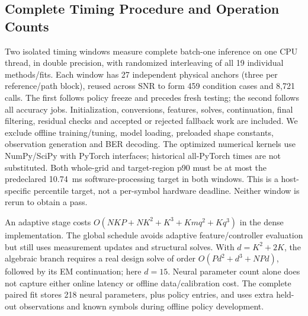 \subsection{Complete Timing Procedure and Operation Counts}
Two isolated timing windows measure complete batch-one inference on one CPU thread, in double precision, with randomized interleaving of all 19 individual methods/fits. Each window has 27 independent physical anchors (three per reference/path block), reused across SNR to form 459 condition cases and 8,721 calls. The first follows policy freeze and precedes fresh testing; the second follows all accuracy jobs. Initialization, conversions, features, solves, continuation, final filtering, residual checks and accepted or rejected fallback work are included. We exclude offline training/tuning, model loading, preloaded shape constants, observation generation and BER decoding. The optimized numerical kernels use NumPy/SciPy with PyTorch interfaces; historical all-PyTorch times are not substituted. Both whole-grid and target-region p90 must be at most the predeclared 10.74~ms software-processing target in both windows. This is a host-specific percentile target, not a per-symbol hardware deadline. Neither window is rerun to obtain a pass.

An adaptive stage costs $O(NKP+NK^2+K^3+Kmq^2+Kq^3)$ in the dense implementation. The global schedule avoids adaptive feature/controller evaluation but still uses measurement updates and structural solves. With $d=K^2+2K$, the algebraic branch requires a real design solve of order $O(Pd^2+d^3+NPd)$, followed by its EM continuation; here $d=15$. Neural parameter count alone does not capture either online latency or offline data/calibration cost. The complete paired fit stores 218 neural parameters, plus policy entries, and uses extra held-out observations and known symbols during offline policy development.

